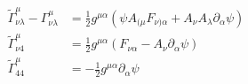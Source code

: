 \begin{align}
\tilde{\Gamma}^{\mu}_{\nu\lambda}-\Gamma^{\mu}_{\nu\lambda}
&=\frac{1}{2}g^{\mu\alpha}\left(\psi A_{(\mu}F_{\nu)\alpha}+A_{\nu}A_{\lambda}\partial_{\alpha}\psi \right)
\\
\tilde{\Gamma}^{\mu}_{\nu 4}
&=\frac{1}{2}g^{\mu\alpha}\left(F_{\nu\alpha}-A_\nu\partial_\alpha \psi\right)\\
\tilde{\Gamma}^{\mu}_{4 4}
&=-\frac{1}{2}g^{\mu\alpha}\partial_{\alpha}\psi
\end{align}
%  
%  
